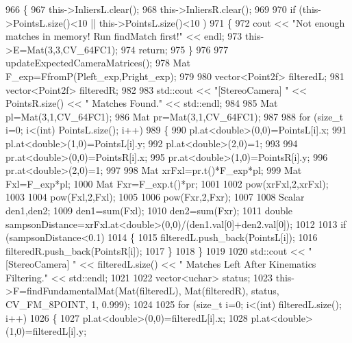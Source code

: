 \begin{DoxyCode}
966 \{
967     this->InliersL.clear();
968     this->InliersR.clear();
969 
970     \textcolor{keywordflow}{if} (this->PointsL.size()<10 || this->PointsL.size()<10 )
971     \{
972         cout << \textcolor{stringliteral}{"Not enough matches in memory! Run findMatch first!"} << endl;
973         this->E=Mat(3,3,CV\_64FC1);
974         \textcolor{keywordflow}{return};
975     \}
976 
977     updateExpectedCameraMatrices();
978     Mat F\_exp=FfromP(Pleft\_exp,Pright\_exp);
979 
980     vector<Point2f> filteredL;
981     vector<Point2f> filteredR;
982 
983     std::cout << \textcolor{stringliteral}{"[StereoCamera] "} << PointsR.size() << \textcolor{stringliteral}{" Matches Found."} << std::endl;
984 
985     Mat pl=Mat(3,1,CV\_64FC1);
986     Mat pr=Mat(3,1,CV\_64FC1);
987 
988     \textcolor{keywordflow}{for} (\textcolor{keywordtype}{size\_t} i=0; i<(int) PointsL.size(); i++)
989     \{
990         pl.at<\textcolor{keywordtype}{double}>(0,0)=PointsL[i].x;
991         pl.at<\textcolor{keywordtype}{double}>(1,0)=PointsL[i].y;
992         pl.at<\textcolor{keywordtype}{double}>(2,0)=1;
993 
994         pr.at<\textcolor{keywordtype}{double}>(0,0)=PointsR[i].x;
995         pr.at<\textcolor{keywordtype}{double}>(1,0)=PointsR[i].y;
996         pr.at<\textcolor{keywordtype}{double}>(2,0)=1;
997 
998         Mat xrFxl=pr.t()*F\_exp*pl;
999         Mat Fxl=F\_exp*pl;
1000         Mat Fxr=F\_exp.t()*pr;
1001 
1002         pow(xrFxl,2,xrFxl);
1003 
1004         pow(Fxl,2,Fxl);
1005 
1006         pow(Fxr,2,Fxr);
1007 
1008         Scalar den1,den2;
1009         den1=sum(Fxl);
1010         den2=sum(Fxr);
1011         \textcolor{keywordtype}{double} sampsonDistance=xrFxl.at<\textcolor{keywordtype}{double}>(0,0)/(den1.val[0]+den2.val[0]);
1012 
1013         \textcolor{keywordflow}{if} (sampsonDistance<0.1)
1014         \{
1015             filteredL.push\_back(PointsL[i]);
1016             filteredR.push\_back(PointsR[i]);
1017         \}
1018     \}
1019 
1020     std::cout << \textcolor{stringliteral}{"[StereoCamera] "} << filteredL.size() << \textcolor{stringliteral}{" Matches Left After Kinematics Filtering."} << 
      std::endl;
1021 
1022     vector<uchar> status;
1023     this->F=findFundamentalMat(Mat(filteredL), Mat(filteredR), status, CV\_FM\_8POINT, 1, 0.999);
1024 
1025     \textcolor{keywordflow}{for} (\textcolor{keywordtype}{size\_t} i=0; i<(int) filteredL.size(); i++)
1026     \{
1027         pl.at<\textcolor{keywordtype}{double}>(0,0)=filteredL[i].x;
1028         pl.at<\textcolor{keywordtype}{double}>(1,0)=filteredL[i].y;

\end{DoxyCode}
